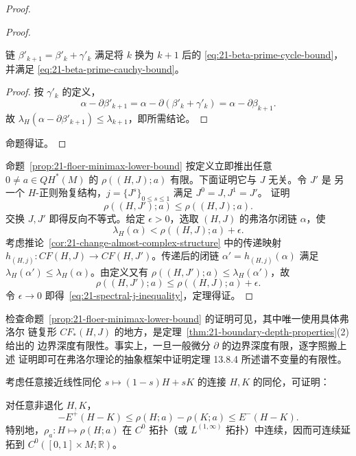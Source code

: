 \begin{proof}
\begin{proof}
\begin{lemma}
\label{lem:21-inductive-beta-prime}
链 $\beta'_{k+1}=\beta'_k+\gamma'_k$ 满足将 $k$ 换为 $k+1$ 后的
\eqref{eq:21-beta-prime-cycle-bound}，并满足
\eqref{eq:21-beta-prime-cauchy-bound}。
\end{lemma}

\begin{proof}
按 $\gamma'_k$ 的定义，
\begin{equation}
 \alpha-\partial\beta'_{k+1}
 =\alpha-\partial(\beta'_k+\gamma'_k)
 =\alpha-\partial\beta_{k+1}.
 \label{eq:21-beta-prime-induction}
\end{equation}
故 $\lambda_H(\alpha-\partial\beta'_{k+1})\leq\lambda_{k+1}$，即所需结论。
\end{proof}
命题得证。
\end{proof}

命题~\ref{prop:21-floer-minimax-lower-bound} 按定义立即推出任意
$0\neq a\in QH^*(M)$ 的 $\rho((H,J);a)$ 有限。下面证明它与 $J$ 无关。令 $J'$ 是
另一个 $H$-正则殆复结构，$j=\{J^s\}_{0\leq s\leq1}$ 满足 $J^0=J,J^1=J'$。
证明
\begin{equation}
 \rho((H,J');a)\leq\rho((H,J);a).
 \label{eq:21-spectral-j-inequality}
\end{equation}
交换 $J,J'$ 即得反向不等式。给定 $\epsilon>0$，选取 $(H,J)$ 的弗洛尔闭链
$\alpha$，使
\[
 \lambda_H(\alpha)<\rho((H,J);a)+\epsilon.
\]
考虑推论~\ref{cor:21-change-almost-complex-structure} 中的传递映射
$h_{(H,j)}:CF(H,J)\to CF(H,J')$。传递后的闭链
$\alpha'=h_{(H,j)}(\alpha)$ 满足
$\lambda_H(\alpha')\leq\lambda_H(\alpha)$。由定义又有
$\rho((H,J');a)\leq\lambda_H(\alpha')$，故
\[
 \rho((H,J');a)\leq\rho((H,J);a)+\epsilon.
\]
令 $\epsilon\to0$ 即得~\eqref{eq:21-spectral-j-inequality}，定理得证。
\end{proof}

\begin{remark}
\label{rem:21-abstract-finiteness-proof}
检查命题~\ref{prop:21-floer-minimax-lower-bound} 的证明可见，其中唯一使用具体弗洛尔
链复形 $CF_*(H,J)$ 的地方，是定理~\ref{thm:21-boundary-depth-properties}(2) 给出的
边界深度有限性。事实上，一旦一般微分 $\partial$ 的边界深度有限，逐字照搬上述
证明即可在弗洛尔理论的抽象框架中证明定理 13.8.4 所述谱不变量的有限性。
\end{remark}

考虑任意接近线性同伦 $s\mapsto(1-s)H+sK$ 的连接 $H,K$ 的同伦，可证明：

\begin{proposition}
\label{prop:21-spectral-continuity}
对任意非退化 $H,K$，
\begin{equation}
 -E^+(H-K)\leq\rho(H;a)-\rho(K;a)\leq E^-(H-K).
 \label{eq:21-spectral-continuity-bound}
\end{equation}
特别地，$\rho_a:H\mapsto\rho(H;a)$ 在 $C^0$ 拓扑（或
$L^{(1,\infty)}$ 拓扑）中连续，因而可连续延拓到
$C^0([0,1]\times M;\mathbb R)$。
\end{proposition}

